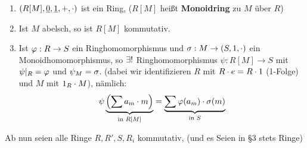 \documentclass[a4paper]{report}
\begin{document}
\begin{ubng}\item
\begin{enumerate}[ a)]
  \item $(R[M], \underline 0, \underline 1, +, \cdot)$ ist ein Ring, ($R[M]$ heißt \textbf{Monoidring} zu $M$ über $R$)
  \item Ist $M$ abelsch, so ist $R[M]$  kommutativ.
  \item Ist $\varphi: R \to S$ ein Ringhomomorphismus und $\sigma : M \to (S, 1, \cdot)$ ein Monoidhomomorphismus, so $\exists !$ Ringhomomorphismus $\psi : R[M] \to S$ mit $\psi|_{R} = \varphi$ und $\psi_{M} = \sigma$. (dabei wir identifizieren $R$ mit $R \cdot e = R \cdot 1$ (1-Folge) und $M$ mit $1_{R} \cdot M$), nämlich:
        \[\psi\underbrace{\left(\sum a_{m}\cdot m\right)}_{\text{in }R[M]} = \underbrace{\sum \varphi(a_{m})\cdot \sigma(m)}_{\text{in } S}\]
\end{enumerate}
\end{ubng}

\begin{kon*}
Ab nun seien alle Ringe $R, R', S, R_{i}$ kommutativ, (und es Seien in §3 stets Ringe)
\end{kon*}
\end{document}
